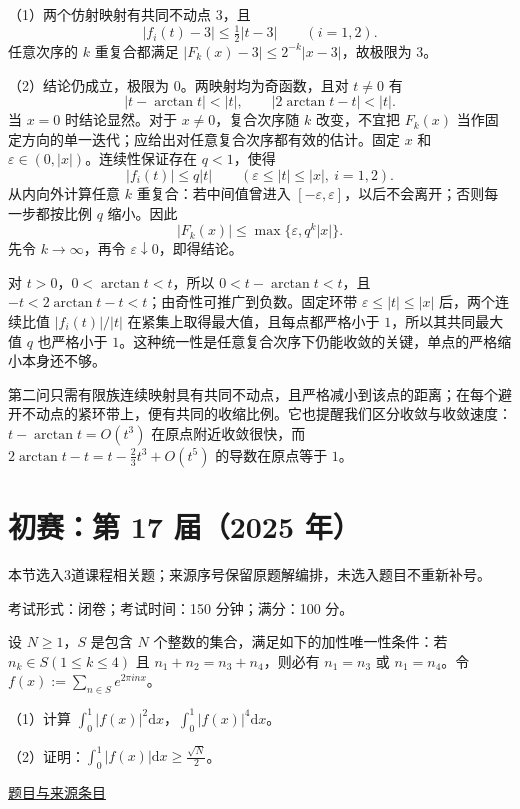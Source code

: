 \documentclass[UTF8,12pt,a4paper,fontset=fandol]{ctexart}
\begin{document}
\begin{solve}\label{ans:ch02-16th-A:6}

（1）两个仿射映射有共同不动点 $3$，且
\[
|f_i(t)-3|\leq\tfrac12|t-3|\qquad(i=1,2).
\]
任意次序的 $k$ 重复合都满足 $|F_k(x)-3|\leq2^{-k}|x-3|$，故极限为 $3$。

（2）结论仍成立，极限为 $0$。两映射均为奇函数，且对 $t\neq0$ 有
\[
|t-\arctan t|<|t|,\qquad |2\arctan t-t|<|t|.
\]
当 $x=0$ 时结论显然。对于 $x\neq0$，复合次序随 $k$ 改变，不宜把 $F_k(x)$ 当作固定方向的单一迭代；应给出对任意复合次序都有效的估计。固定 $x$ 和 $\varepsilon\in(0,|x|)$。连续性保证存在 $q<1$，使得
\[
|f_i(t)|\leq q|t|\qquad
(\varepsilon\leq|t|\leq|x|,\ i=1,2).
\]
从内向外计算任意 $k$ 重复合：若中间值曾进入 $[-\varepsilon,\varepsilon]$，以后不会离开；否则每一步都按比例 $q$ 缩小。因此
\[
|F_k(x)|\leq\max\{\varepsilon,q^k|x|\}.
\]
先令 $k\to\infty$，再令 $\varepsilon\downarrow0$，即得结论。

对 $t>0$，$0<\arctan t<t$，所以 $0<t-\arctan t<t$，且 $-t<2\arctan t-t<t$；由奇性可推广到负数。固定环带 $\varepsilon\le|t|\le|x|$ 后，两个连续比值 $|f_i(t)|/|t|$ 在紧集上取得最大值，且每点都严格小于 $1$，所以其共同最大值 $q$ 也严格小于 $1$。这种统一性是任意复合次序下仍能收敛的关键，单点的严格缩小本身还不够。

\end{solve}

\begin{remark}[方法与条件]第二问只需有限族连续映射具有共同不动点，且严格减小到该点的距离；在每个避开不动点的紧环带上，便有共同的收缩比例。它也提醒我们区分收敛与收敛速度：$t-\arctan t=O(t^3)$ 在原点附近收敛很快，而 $2\arctan t-t=t-\tfrac23t^3+O(t^5)$ 的导数在原点等于 $1$。\end{remark}

\section{初赛：第 17 届（2025 年）}

本节选入3道课程相关题；来源序号保留原题解编排，未选入题目不重新补号。

\begin{remark}[来源说明]考试形式：闭卷；考试时间：150 分钟；满分：100 分。\end{remark}

\begin{example}[来源序号2]\label{ex:ch01-17th-A:2}\label{pr:ch01-17th-A:2}

设 $N \geq 1$，$S$ 是包含 $N$ 个整数的集合，满足如下的加性唯一性条件：若 $n_k \in S (1 \leq k \leq 4)$ 且 $n_1 + n_2 = n_3 + n_4$，则必有 $n_1 = n_3$ 或 $n_1 = n_4$。令 $f(x) := \sum_{n \in S} e^{2\pi i nx}$。

（1）计算 $\int_0^1 |f(x)|^2 \mathrm{d}x$，$\int_0^1 |f(x)|^4 \mathrm{d}x$。

（2）证明：$\int_0^1 |f(x)| \mathrm{d}x \geq \frac{\sqrt{N}}{2}$。

\par\href{https://github.com/lzxcr/cmc-mathematics/blob/64916fa1fdbc3e444a652eca204d5669058ee321/src/problems/preliminary/17/02.md}{题目与来源条目}

\end{example}
\end{document}
